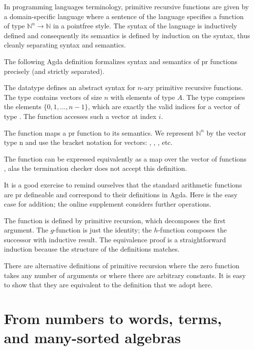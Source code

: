 \documentclass{jfp}
\begin{document}
In programming languages terminology, primitive
recursive functions are given by a domain-specific language where a
sentence of the language specifies a function of type ${ℕ}^n \to {ℕ}$
in a pointfree style. The syntax of the language is inductively
defined and consequently its semantics is defined by induction on the
syntax, thus cleanly separating syntax and semantics.

The following Agda definition formalizes syntax and semantics of pr
functions precisely (and strictly separated).

The datatype  defines an abstract syntax for $n$-ary primitive recursive functions.
The type  contains vectors of size $n$ with elements of type $A$.
The type  comprises the elements $\{0, 1, \dots, n-1\}$, which
are exactly the valid indices for a vector of type . 
The function  accesses such a vector at index $i$.

\PRNat

The function  maps a pr function to its semantics.
We represent ${ℕ}^n$ by the vector type n and use the bracket notation for vectors: \Anil, , , etc.

\PRNatEval

The function  can be expressed equivalently as a
map over the vector of functions , alas the termination
checker does not accept this definition.  


It is a good exercise to remind ourselves that the standard arithmetic
functions are pr defineable and correspond to their definitions in
Agda. Here is the easy case for addition; the online supplement
considers further operations. 

\PRNatExampleAdd
The function  is defined by primitive recursion, which
decomposes the first argument. The $g$-function is just the identity;
the $h$-function composes the successor with inductive result.
The equivalence proof is a
straightforward induction because the structure of the definitions
matches.

There are alternative definitions of primitive recursion where the
zero function takes any number of arguments or where there are
arbitrary constants. It is easy to show that they are equivalent to
the definition that we adopt here.

\section{From numbers to words, terms, and many-sorted algebras}
\label{sec:from-numbers-words}
\end{document}
